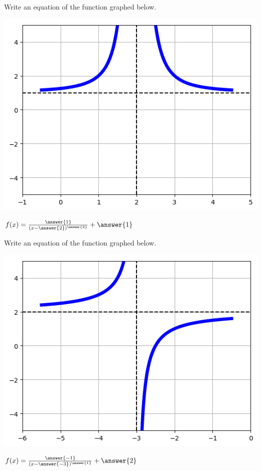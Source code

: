 \documentclass{ximera}
\begin{document}
\begin{question}
Write an equation of the function graphed below. 

	\begin{center}
	    \includegraphics{graphRationalQ5.png}
	\end{center}

$f(x) = \frac{\answer{1}}{(x - \answer{2})^{\answer{2}}} + \answer{1}$
\end{question}

\begin{question}
Write an equation of the function graphed below. 

	\begin{center}
	    \includegraphics{graphRationalQ6.png}
	\end{center}

$f(x) = \frac{\answer{-1}}{(x - \answer{-3})^{\answer{1}}} + \answer{2}$
\end{question}
\end{document}

